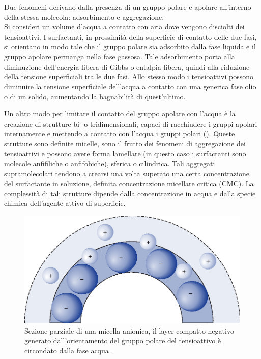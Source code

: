 Due fenomeni derivano dalla presenza di un gruppo polare e apolare all'interno della stessa molecola: adsorbimento e aggregazione.\\
Si consideri un volume d'acqua a contatto con aria dove vengono disciolti dei tensioattivi. I surfactanti, in prossimità della superficie di contatto delle due fasi, si orientano in modo tale che il gruppo polare sia adsorbito dalla fase liquida e il gruppo apolare permanga nella fase gassosa. Tale adsorbimento porta alla diminuzione dell'energia libera di Gibbs o entalpia libera, quindi alla riduzione della tensione superficiali tra le due fasi. Allo stesso modo i tensioattivi possono diminuire la tensione superficiale dell'acqua a contatto con una generica fase olio o di un solido, aumentando la bagnabilità di quest'ultimo.

Un altro modo per limitare il contatto del gruppo apolare con l'acqua è la creazione di strutture bi- o tridimensionali, capaci di racchiudere i gruppi apolari internamente e mettendo a contatto con l'acqua i gruppi polari (). Queste strutture sono definite micelle, sono il frutto dei fenomeni di aggregazione dei tensioattivi e possono avere forma lamellare (in questo caso i surfactanti sono molecole anfifiliche o anfifobiche), sferica o cilindrica.  Tali aggregati supramolecolari tendono a crearsi una volta superato una certa concentrazione del surfactante in soluzione, definita concentrazione micellare critica (CMC). La complessità di tali strutture dipende dalla concentrazione in acqua e dalla specie chimica dell'agente attivo di superficie.

\begin{figure}[htbp]
    \centering
    \includegraphics[width=.5\textwidth]{fig/foamer/micelle.eps}
    \caption{Sezione parziale di una micella anionica, il layer compatto negativo generato dall'orientamento del gruppo polare del tensioattivo è circondato dalla fase acqua  \parencite{attwood2012fasttrack}.}
    \label{fig:micelle}
\end{figure}

